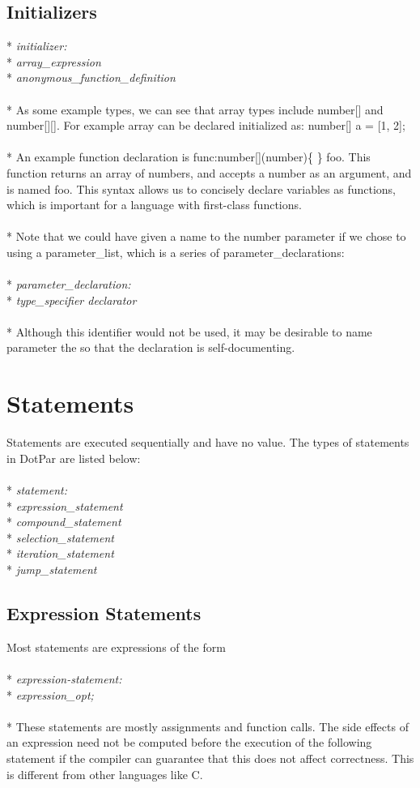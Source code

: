 \subsection{Initializers}
* \tab \emph{initializer:}
\\* \tab \tab \emph{array\_expression}
\\* \tab \tab \emph{anonymous\_function\_definition}
\\ \\* As some example types, we can see that array types include number[] and number[][]. For example array can be declared initialized as: number[] a = [1, 2];
\\ \\* An example function declaration is func:number[](number)\{ \} foo. This function returns an array of numbers, and accepts a number as an argument, and is named foo. This syntax allows us to concisely declare variables as functions, which is important for a language with first-class functions.
\\ \\* Note that we could have given a name to the number parameter if we chose to using a parameter\_list, which is a series of parameter\_declarations:
\\ \\* \tab \emph{parameter\_declaration:}
\\* \tab \tab \emph{type\_specifier declarator}
\\ \\* Although this identifier would not be used, it may be desirable to name parameter the so that the declaration is self-documenting.

\section{Statements}
Statements are executed sequentially and have no value. The types of statements in DotPar are listed below:
\\ \\* \tab \emph{statement:}
\\* \tab \tab \emph{expression\_statement}
\\* \tab \tab \emph{compound\_statement}
\\* \tab \tab \emph{selection\_statement}
\\* \tab \tab \emph{iteration\_statement}
\\* \tab \tab \emph{jump\_statement}

\subsection{Expression Statements}
Most statements are expressions of the form
\\ \\* \tab \emph{expression-statement:}
\\* \tab \tab \emph{expression\_opt;}
\\ \\* These statements are mostly assignments and function calls. The side effects of an expression need not be computed before the execution of the following statement if the compiler can guarantee that this does not affect correctness. This is different from other languages like C.

